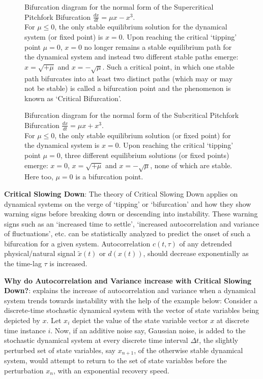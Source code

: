 \begin{figure}[!ht]
	\label{fig:bifPitchforkSupercritical}
	\caption{Bifurcation diagram for the normal form of the Supercritical Pitchfork Bifurcation $\frac{dx}{dt} = \mu x - x^3$. \\ For $\mu \leq 0$, the only stable equilibrium solution for the dynamical system (or fixed point) is $x=0$. Upon reaching the critical `tipping' point $\mu=0$, $x=0$ no longer remains a stable equilibrium path for the dynamical system and instead two different stable paths emerge: $x = \sqrt{+\mu}$ and $x = -\sqrt{\mu}$. Such a critical point, in which one stable path bifurcates into at least two distinct paths (which may or may not be stable) is called a bifurcation point and the phenomenon is known as `Critical Bifurcation'.}
\end{figure}

\begin{figure}[!ht]
	\label{fig:bifPitchforkSubcritical}
	\caption{Bifurcation diagram for the normal form of the Subcritical Pitchfork Bifurcation $\frac{dx}{dt} = \mu x + x^3$. \\ For $\mu \leq 0$, the only stable equilibrium solution (or fixed point) for the dynamical system is $x=0$. Upon reaching the critical `tipping' point $\mu=0$, three different equilibrium solutions (or fixed points) emerge: $x=0$, $x = \sqrt{+\mu}$ and $x = -\sqrt{\mu}$, none of which are stable. Here too, $\mu=0$ is a bifurcation point.}
\end{figure}


\textbf{Critical Slowing Down}: The theory of Critical Slowing Down applies on dynamical systems on the verge of `tipping' or `bifurcation' and how they show warning signs before breaking down or descending into instability. These warning signs such as an `increased time to settle', `increased autocorrelation and variance of fluctuations', etc. \cite{schefferEarlyWarningSignalsForCriticalTransitions} can be statistically analyzed to predict the onset of such a bifurcation for a given system.
Autocorrelation $c(t, \tau)$ of any detrended physical/natural signal $\tilde{x}(t)$ or $d(x(t))$, should decrease exponentially as the time-lag $\tau$ is increased.

\textbf{Why do Autocorrelation and Variance increase with Critical Slowing Down?}:
\cite{schefferEarlyWarningSignalsForCriticalTransitions} explains the increase of autocorrelation and variance when a dynamical system trends towards instability with the help of the example below:
Consider a discrete-time stochastic dynamical system with the vector of state variables being depicted by $x$. Let $x_i$ depict the value of the state variable vector $x$ at discrete time instance $i$.
Now, if an additive noise say, Gaussian noise, is added to the stochastic dynamical system at every discrete time interval $\Delta t$, the slightly perturbed set of state variables, say $x_{n+1}$, of the otherwise stable dynamical system, would attempt to return to the set of state variables before the perturbation $x_n$, with an exponential recovery speed.

